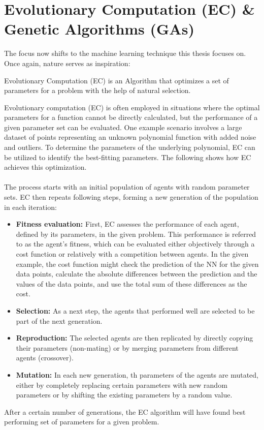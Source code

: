 \documentclass[11pt]{report}
\newcommand{\mydeflabel}{}
\newenvironment{mydef}[1]
{\renewcommand\mydeflabel{#1}\begin{mydefinner}}
{\end{mydefinner}}
\begin{document}
    \section{Evolutionary Computation (EC) \& Genetic Algorithms (GAs)}\label{sec:evolutionary-computation-(ec)-&-genetic-algorithms-(gas)}
    The focus now shifts to the machine learning technique this thesis focuses on.
    Once again, nature serves as inspiration:
    \begin{mydef}{Evolutionary Computation}
        Evolutionary Computation (EC) is an Algorithm that optimizes a set of parameters for a problem with the help of natural selection.
    \end{mydef}
    Evolutionary computation (EC) is often employed in situations where the optimal parameters for a function cannot be directly calculated, but the performance of a given parameter set can be evaluated.
    One example scenario involves a large dataset of points representing an unknown polynomial function with added noise and outliers.
    To determine the parameters of the underlying polynomial, EC can be utilized to identify the best-fitting parameters.
    The following shows how EC achieves this optimization.
    \\ \\
    The process starts with an initial population of agents with random parameter sets.
    EC then repeats following steps, forming a new generation of the population in each iteration:
    \begin{itemize}
        \item \textbf{Fitness evaluation:} First, EC assesses the performance of each agent, defined by its parameters, in the given problem.
        This performance is referred to as the agent's fitness, which can be evaluated either objectively through a cost function or relatively with a competition between agents.
        In the given example, the cost function might check the prediction of the NN for the given data points, calculate the absolute differences between the prediction and the values of the data points, and use the total sum of these differences as the cost.
        \item \textbf{Selection:} As a next step, the agents that performed well are selected to be part of the next generation.
        \item \textbf{Reproduction:} The selected agents are then replicated by directly copying their parameters (non-mating) or by merging parameters from different agents (crossover).
        \item \textbf{Mutation:} In each new generation, th parameters of the agents are mutated, either by completely replacing certain parameters with new random parameters or by shifting the existing parameters by a random value.
    \end{itemize}
    After a certain number of generations, the EC algorithm will have found best performing set of parameters for a given problem.
\end{document}
